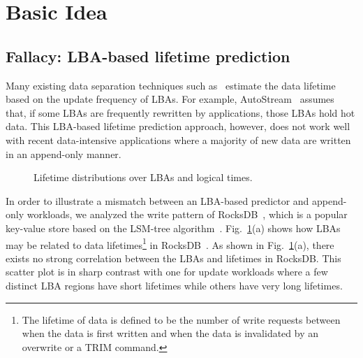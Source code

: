 \section{Basic Idea}
\subsection{Fallacy: LBA-based lifetime prediction}
Many existing data separation techniques such as~\cite{AutoStream, HotCold} 
estimate the data lifetime based on the update frequency of LBAs.  
For example, AutoStream~\cite{AutoStream} assumes that, if
some LBAs are frequently rewritten by applications, those LBAs hold hot data.
This LBA-based lifetime prediction 
approach, however, does not work well with recent data-intensive 
applications where a majority of
new data are written in an append-only manner.  

\begin{figure}[t]
	\centering
	\vspace{-10pt}
	\caption{
		Lifetime distributions over LBAs and logical times.}
		\label{fig:lba_lifetime}
	\vspace{-15pt}
\end{figure}


In order to illustrate a mismatch between an LBA-based predictor and 
append-only workloads, we analyzed the write pattern of 
RocksDB~\cite{RocksDB}, which is a
popular key-value store based on the LSM-tree algorithm~\cite{LSM}.
Fig.~\ref{fig:lba_lifetime}(a) shows how LBAs may be related 
to data lifetimes\footnote{The lifetime of data is defined to be 
the number of write requests between when the data is first written 
and when the data is invalidated by an overwrite or a TRIM command.}
in RocksDB~\cite{RocksDB}.  
As shown in Fig.~\ref{fig:lba_lifetime}(a), 
there exists no strong correlation between the LBAs and lifetimes in RocksDB.  
This scatter plot is in sharp contrast with one for update workloads 
where a few distinct LBA regions have short lifetimes while others 
have very long lifetimes.

